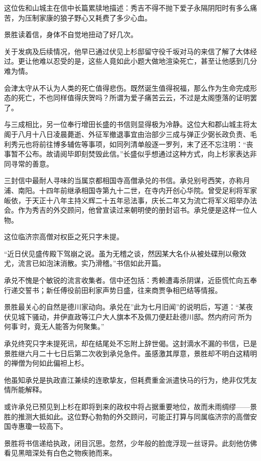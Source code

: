 \documentclass[
]{article}
\begin{document}
这位佐和山城主在信中长篇累牍地描述：秀吉不得不抛下爱子永隔阴阳时有多么痛苦，为压制家康的狼子野心又耗费了多少心血。

景胜读着信，身体不自觉地扭动了好几次。

关于发病及后续情况，他早已通过伏见上杉邸留守役千坂对马的来信了解了大体经过。更让他难以忍受的是，这些人竟如此小题大做地渲染死亡，甚至让他感到几分难为情。

会津太守从不认为人类的死亡值得悲伤。既然诞生值得祝福，那么作为生命完成形态的死亡，不也同样值得庆贺吗？所谓为爱子痛苦云云，不过是太阁堕落的证明罢了。

与三成相比，另一位奉行增田长盛的书信则显得极为冷静。这位大和郡山城主将太阁于八月十八日凌晨薨逝、外征军撤退事宜由治部少三成与弹正少弼长政负责、毛利秀元也将前往博多辅佐等事项，如同列清单般逐一罗列，末了还不忘注明：``丧事暂不公布。故请阅毕即刻焚毁此信。''长盛似乎想通过这种方式，向上杉家表达非同寻常的善意。

三封信中最耐人寻味的当属京都相国寺高僧承兑的书信。承兑别号西笑，亦称月浦、南阳。十四年前继承相国寺第九十二世，在寺内开创心华院。曾受足利将军家皈依，于天正十八年主持义辉二十五年忌法事，庆长二年又为流亡将军义昭举办法会。作为秀吉的外交顾问，他曾宣读过来朝明使的册封诏书。承兑便是这样一位人物。

这位临济宗高僧对权臣之死只字未提。

``近日伏见盛传殿下驾崩之说。虽为无稽之谈，然因某大名仆从被处碟刑以儆效尤，流言已如泡沫消散。实乃滑稽。''书信如此开篇。

承兑不愧是个敏锐的流言收集者。信中还包括：秀赖遭毒杀阴谋，近臣慌忙向五奉行递交誓书；新任傅役前田利家声势日盛，往来商贾争相巴结等情报。

景胜最关心的自然是德川家动向。承兑在''此为七月旧闻''的说明后，写道：``某夜伏见城下骚动，井伊直政等江户大人旗本不及佩刀便赶赴德川邸。然内府问'所为何事'时，竟无人能答为何聚集。''

承兑终究只字未提死讯，却在结尾处不忘附上辞世偈。这封滴水不漏的书信，已是景胜继六月二十七日后第二次收到承兑急件。虽感激其厚意，景胜却不明白这精明的禅僧为何如此偏袒上杉。

他虽知承兑是执政直江兼续的连歌挚友，但耗费重金派遣快马的行为，绝非仅凭友情所能解释。

或许承兑已预见到上杉在即将到来的政权中将占据重要地位，故而未雨绸缪------景胜的推测大抵如此。这位野心勃勃的外交顾问，可能正打算与同属临济宗的高僧安国寺惠瓊一较高下。

景胜将书信递给执政，闭目沉思。忽然，少年般的脸庞浮现一丝讶异。此刻他仿佛看见黑暗深处有白色之物疾驰而来。
\end{document}
